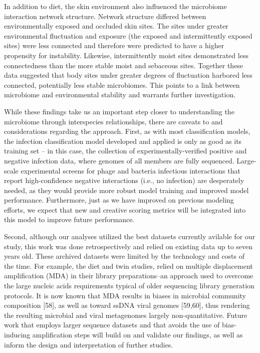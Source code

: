 \documentclass[12pt,]{article}
\begin{document}
In addition to diet, the skin environment also influenced the microbiome
interaction network structure. Network structure differed between
environmentally exposed and occluded skin sites. The sites under greater
environmental fluctuation and exposure (the exposed and intermittently
exposed sites) were less connected and therefore were predicted to have
a higher propensity for instability. Likewise, intermittently moist
sites demonstrated less connectedness than the more stable moist and
sebaceous sites. Together these data suggested that body sites under
greater degrees of fluctuation harbored less connected, potentially less
stable microbiomes. This points to a link between microbiome and
environmental stability and warrants further investigation.

While these findings take us an important step closer to understanding
the microbiome through interspecies relationships, there are caveats to
and considerations regarding the approach. First, as with most
classification models, the infection classification model developed and
applied is only as good as its training set -- in this case, the
collection of experimentally-verified positive and negative infection
data, where genomes of all members are fully sequenced. Large-scale
experimental screens for phage and bacteria infectious interactions that
report high-confidence negative interactions (i.e., no infection) are
desperately needed, as they would provide more robust model training and
improved model performance. Furthermore, just as we have improved on
previous modeling efforts, we expect that new and creative scoring
metrics will be integrated into this model to improve future
performance.

Second, although our analyses utilized the best datasets currently
avilable for our study, this work was done retrospectively and relied on
existing data up to seven years old. These archived datasets were
limited by the technology and costs of the time. For example, the diet
and twin studies, relied on multiple displacement amplification (MDA) in
their library preparations--an approach used to overcome the large
nucleic acids requirements typical of older sequencing library
generation protocols. It is now known that MDA results in biases in
microbial community composition {[}58{]}, as well as toward ssDNA viral
genomes {[}59,60{]}, thus rendering the resulting microbial and viral
metagenomes largely non-quantitative. Future work that employs larger
sequence datasets and that avoids the use of bias-inducing amplification
steps will build on and validate our findings, as well as inform the
design and interpretation of further studies.
\end{document}
